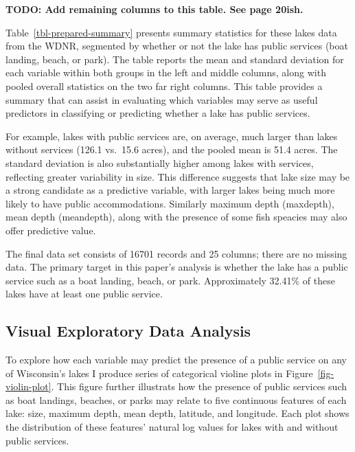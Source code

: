 \documentclass[
]{article}
\begin{document}
\textbf{TODO: Add remaining columns to this table. See page 20ish.}

Table~\ref{tbl-prepared-summary} presents summary statistics for these
lakes data from the WDNR, segmented by whether or not the lake has
public services (boat landing, beach, or park). The table reports the
mean and standard deviation for each variable within both groups in the
left and middle columns, along with pooled overall statistics on the two
far right columns. This table provides a summary that can assist in
evaluating which variables may serve as useful predictors in classifying
or predicting whether a lake has public services.

For example, lakes with public services are, on average, much larger
than lakes without services (126.1 vs.~15.6 acres), and the pooled mean
is 51.4 acres. The standard deviation is also substantially higher among
lakes with services, reflecting greater variability in size. This
difference suggests that lake size may be a strong candidate as a
predictive variable, with larger lakes being much more likely to have
public accommodations. Similarly maximum depth (maxdepth), mean depth
(meandepth), along with the presence of some fish speacies may also
offer predictive value.

The final data set consists of 16701 records and 25 columns; there are
no missing data. The primary target in this paper's analysis is whether
the lake has a public service such as a boat landing, beach, or park.
Approximately 32.41\% of these lakes have at least one public service.

\subsection{Visual Exploratory Data
Analysis}\label{visual-exploratory-data-analysis}

To explore how each variable may predict the presence of a public
service on any of Wisconsin's lakes I produce series of categorical
violine plots in Figure~\ref{fig-violin-plot}. This figure further
illustrats how the presence of public services such as boat landings,
beaches, or parks may relate to five continuous features of each lake:
size, maximum depth, mean depth, latitude, and longitude. Each plot
shows the distribution of these features' natural log values for lakes
with and without public services.
\end{document}
